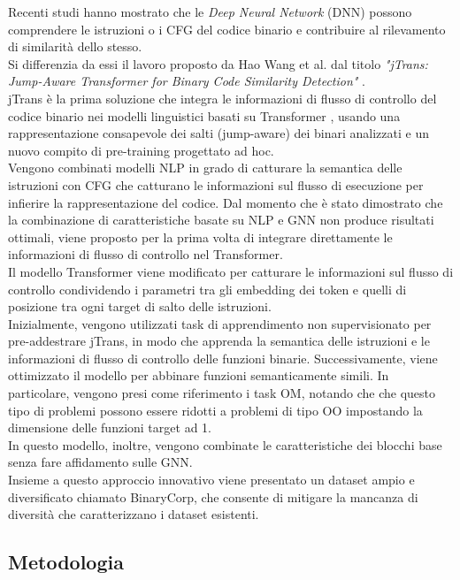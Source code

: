 \documentclass[12pt,a4paper,openright,twoside]{report}
\begin{document}
Recenti studi hanno mostrato che le \textit{Deep Neural Network} (DNN) \cite{goodfellow2016deep} possono comprendere le istruzioni o i CFG del codice binario e contribuire al rilevamento di similarità dello stesso.\\
Si differenzia da essi il lavoro proposto da Hao Wang et al. dal titolo \textit{"jTrans: Jump-Aware Transformer for Binary Code Similarity Detection"} \cite{jTrans}.\\
jTrans è la prima soluzione che integra le informazioni di flusso di controllo del codice binario nei modelli linguistici basati su Transformer \cite{Transformer}, usando una rappresentazione consapevole dei salti (jump-aware) dei binari analizzati e un nuovo compito di pre-training progettato ad hoc.\\
Vengono combinati modelli NLP in grado di catturare la semantica delle istruzioni con CFG che catturano le informazioni sul flusso di esecuzione per infierire la rappresentazione del codice. Dal momento che è stato dimostrato che la combinazione di caratteristiche basate su NLP e GNN non produce risultati ottimali, viene proposto per la prima volta di integrare direttamente le informazioni di flusso di controllo nel Transformer.\\
Il modello Transformer viene modificato per catturare le informazioni sul flusso di controllo condividendo i parametri tra gli embedding dei token e quelli di posizione tra ogni target di salto delle istruzioni.\\
Inizialmente, vengono utilizzati task di apprendimento non supervisionato per pre-addestrare jTrans, in modo che apprenda la semantica delle istruzioni e le informazioni di flusso di controllo delle funzioni binarie. Successivamente, viene ottimizzato il modello per abbinare funzioni semanticamente simili. In particolare, vengono presi come riferimento i task OM, notando che che questo tipo di problemi possono essere ridotti a problemi di tipo OO impostando la dimensione delle funzioni target ad 1.\\
In questo modello, inoltre, vengono combinate le caratteristiche dei blocchi base senza fare affidamento sulle GNN.\\
Insieme a questo approccio innovativo viene presentato un dataset ampio e diversificato chiamato BinaryCorp, che consente di mitigare la mancanza di diversità che caratterizzano i dataset esistenti.

\subsection{Metodologia}
\end{document}
